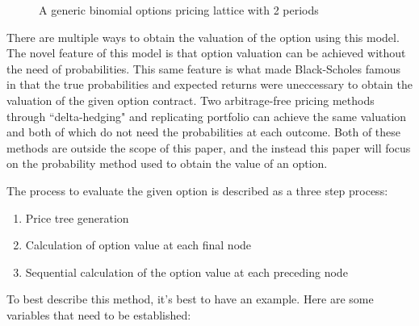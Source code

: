 \documentclass[12pt, letterpaper]{article}\usepackage{float}
\begin{document}
\begin{figure}[H]
  \caption{A generic binomial options pricing lattice with 2 periods}
  \label{fig:genericlattice}
\end{figure}

\pagebreak
There are multiple ways to obtain the valuation of the option using this model.
The novel feature of this model is that option valuation can be achieved without the need of probabilities.
This same feature is what made Black-Scholes famous in that the true probabilities and expected returns were uneccessary to obtain the valuation of the given option contract\cite{brigidavideo}.
Two arbitrage-free pricing methods through ``delta-hedging" and replicating portfolio can achieve the same valuation and both of which do not need the probabilities at each outcome.
Both of these methods are outside the scope of this paper, and the instead this paper will focus on the probability method used to obtain the value of an option.

\bigskip

The process to evaluate the given option is described as a three step process\cite{bopmwikipedia}:
\begin{enumerate}[leftmargin=2\parindent]
  \item Price tree generation
  \item Calculation of option value at each final node
  \item Sequential calculation of the option value at each preceding node
\end{enumerate}

\bigskip

To best describe this method, it's best to have an example.
Here are some variables that need to be established:
\end{document}
